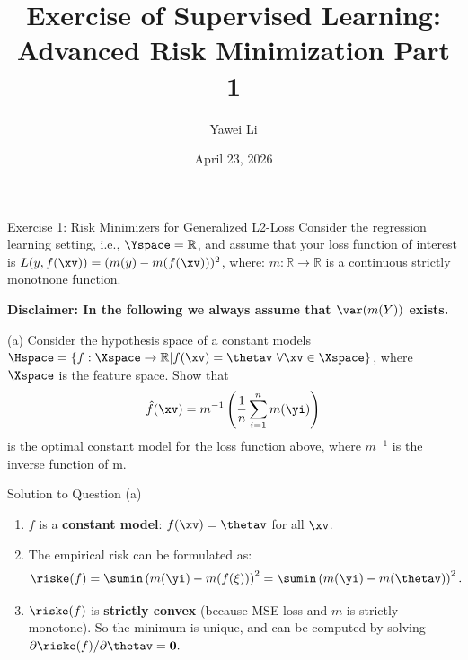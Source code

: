 \documentclass[aspectratio=169]{beamer}
\title[]{\textbf{Exercise of Supervised Learning:\\ Advanced Risk Minimization Part 1}}
\author{Yawei Li}
\institute[LMU]
{
\\
  \texttt{yawei.li@stat.uni-muenchen.de}
}
\date{April 23, 2026}
\begin{document}
\begin{frame}
\titlepage

\end{frame}

\begin{frame}{Exercise 1: Risk Minimizers for Generalized L2-Loss}
Consider the regression learning setting, i.e., $\Yspace = \mathbb{R}$, and assume that your loss function of interest is $L(y, f(\xv)) = (m(y) - m(f(\xv)))^2$, where: $m: \mathbb{R} \to \mathbb{R}$ is a continuous strictly monotnone function.

\textbf{Disclaimer: In the following we always assume that $\var(m(Y))$ exists.}

(a) Consider the hypothesis space of a constant models $\Hspace = \{f: \Xspace \rightarrow \mathbb{R} | f(\xv) = \thetav \ \forall \xv \in \Xspace \}$, where $\Xspace$ is the feature space. Show that 
$$
	\hat{f}(\xv) = m^{-1}\left( \frac{1}{n} \sum_{i=1}^n m(\yi) \right)
$$
is the optimal constant model for the loss function above, where $m^{-1}$ is the inverse function of m.
	
\end{frame}

\begin{frame}{Solution to Question (a)}
	\begin{enumerate}
		\item<1-> $f$ is a \textbf{constant model}: $f(\xv) = \thetav$ for all $\xv$.
		\item<2-> The empirical risk can be formulated as:
			$$\riske(f) = \sumin \left(m(\yi) - m(f(\xi)) \right)^2 = \sumin \left(m(\yi) - m(\thetav) \right)^2.$$
		\item<3-> $\riske(f)$ is \textbf{strictly convex} (because MSE loss and $m$ is strictly monotone). So the minimum is unique, and can be computed by solving $\partial{\riske(f)} / \partial \thetav = \bm{0}.$
	\end{enumerate}
\end{frame}
\end{document}
